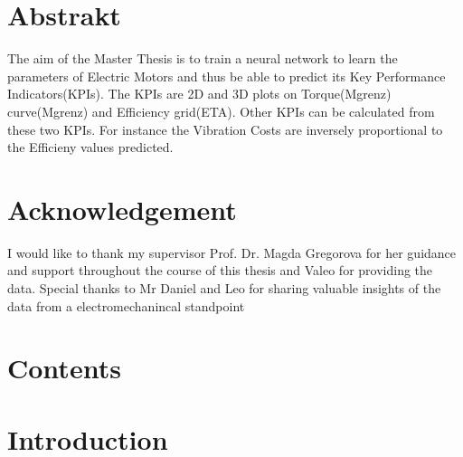 \documentclass[a4paper,12pt]{article}
\begin{document}
\section*{Abstrakt}
The aim of the Master Thesis is to train a neural network to learn the parameters of Electric Motors and thus be able to predict its Key Performance Indicators(KPIs).
The KPIs are 2D and 3D plots on Torque(Mgrenz) curve(Mgrenz) and Efficiency grid(ETA). Other KPIs can be calculated from these two KPIs.
For instance the Vibration Costs are inversely proportional to the Efficieny values predicted. 

\newpage 

\newpage 

\section*{Acknowledgement}
I would like to thank my supervisor Prof. Dr. Magda Gregorova for her guidance and support throughout the course of this thesis and Valeo for providing the data.
Special thanks to Mr Daniel and Leo for sharing valuable insights of the data from a electromechanincal standpoint

\newpage

\newpage

\section*{Contents} 

\newpage

\newpage

\section*{Introduction} 
\end{document}
